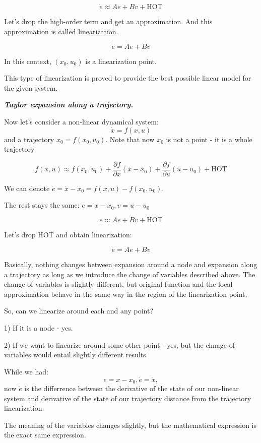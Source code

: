 \[
    \dot e \approx A e + B v + \text{HOT}
\]


Let's drop the high-order term and get an approximation. And this approximation is called \underline{linearization}. 


\[\dot e = Ae + Bv\]

In this context, $(x_0, u_0)$ is a linearization point. 

This type of linearization is proved to provide the best possible linear model for the given system.

\begin{center}
    \textit{\textbf{Taylor expansion along a trajectory.}}
\end{center}

Now let's consider a non-linear dynamical system:
\[\dot x = f(x, u)\] and a trajectory $x_0 = f(x_0, u_0)$. Note that now $x_0$ is not a point - it is a whole trajectory


\[
    f(x, u) \approx f(x_0, u_0) + \frac{\partial f}{\partial x} (x-x_0) + \frac{\partial f}{\partial u} (u-u_0) + \text{HOT}
\]

We can denote $\dot e = \dot x - \dot x_0 = f(x, u) - f(x_0, u_0)$. 

The rest stays the same: $e = x - x_0, v = u - u_0$

\[
    \dot e \approx A e + B v + \text{HOT}
\]

Let's drop HOT and obtain linearization:

\[
    \dot e = A e + B v 
\]



Basically, nothing changes between expansion around a node and expansion along a trajectory as long as we introduce the change of variables described above. 
The change of variables is slightly different, but original function and the local approximation behave in the same way in the region of the linearization point.


So, can we linearize around each and any point?

1) If it is a node - yes. 

2) If we want to linearize around some other point - yes, but the chnage of variables would entail slightly 
different results. 

While we had:
\[ e = x - x_0, \dot e = \dot x,\] now
$\dot e$ is the differrence between the derivative of the state of our non-linear system and derivative of the state of our trajectory distance from the trajectory linearization.  

The meaning of the variables changes slightly, but the mathematical expression is the exact same expression. 


